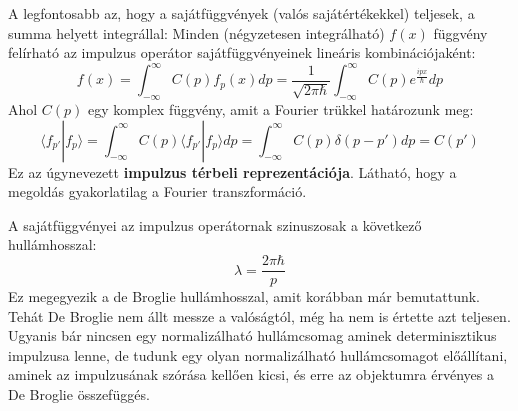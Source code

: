 \documentclass[../main.tex]{subfiles}
\begin{document}
A legfontosabb az, hogy a sajátfüggvények (valós sajátértékekkel) teljesek, a summa helyett integrállal: Minden (négyzetesen integrálható) $f(x)$ függvény felírható az impulzus operátor sajátfüggvényeinek lineáris kombinációjaként:
\begin{equation}
    f(x) = \int_{-\infty}^{\infty} C(p) f_p(x) dp = \frac{1}{\sqrt{2\pi \hbar}} \int_{-\infty}^{\infty} C(p) e^{\frac{i p x}{\hbar}} dp
\end{equation}
Ahol $C(p)$ egy komplex függvény, amit a Fourier trükkel határozunk meg:
\begin{equation}
    \langle f_{p'} | f_p \rangle = \int_{-\infty}^{\infty} C(p) \langle f_{p'} | f_p \rangle dp = \int_{-\infty}^{\infty} C(p) \delta(p - p') dp = C(p')
\end{equation}
Ez az úgynevezett \textbf{impulzus térbeli reprezentációja}. Látható, hogy a megoldás gyakorlatilag a Fourier transzformáció.

A sajátfüggvényei az impulzus operátornak szinuszosak a következő hullámhosszal:
\begin{equation}
    \lambda = \frac{2 \pi \hbar}{p}
\end{equation}
Ez megegyezik a de Broglie hullámhosszal, amit korábban már bemutattunk. Tehát De Broglie nem állt messze a valóságtól, még ha nem is értette azt teljesen. Ugyanis bár nincsen egy 
normalizálható hullámcsomag aminek determinisztikus impulzusa lenne, de tudunk egy olyan normalizálható hullámcsomagot előállítani, aminek az impulzusának szórása kellően kicsi, és erre az objektumra érvényes a De Broglie összefüggés.
\end{document}
